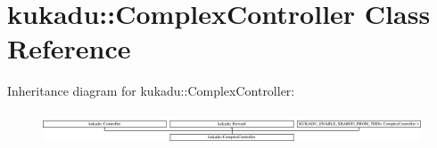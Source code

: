 \hypertarget{classkukadu_1_1ComplexController}{\section{kukadu\-:\-:Complex\-Controller Class Reference}
\label{classkukadu_1_1ComplexController}
}
Inheritance diagram for kukadu\-:\-:Complex\-Controller\-:\begin{figure}[H]
\begin{center}
\leavevmode
\includegraphics[height=0.957265cm]{classkukadu_1_1ComplexController}
\end{center}
\end{figure}
